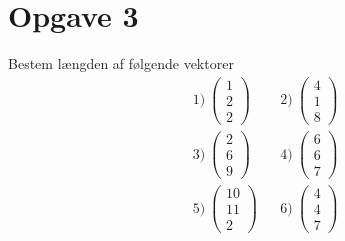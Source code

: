 \section*{Opgave 3}
Bestem længden af følgende vektorer
\begin{align*}
	&1) \ 
	\begin{pmatrix}
		1 \\ 2 \\ 2
	\end{pmatrix}
	&&2) \ 
	\begin{pmatrix}
		4 \\ 1 \\ 8
	\end{pmatrix}
	\\
	&3) \ 
	\begin{pmatrix}
		2 \\ 6 \\ 9
	\end{pmatrix}
	&&4) \ 
	\begin{pmatrix}
		6 \\ 6 \\ 7
	\end{pmatrix}
	\\
	&5) \ 
	\begin{pmatrix}
		10 \\ 11 \\ 2
	\end{pmatrix}
	&&6) \ 
	\begin{pmatrix}
		4 \\ 4 \\ 7
	\end{pmatrix}
\end{align*}

